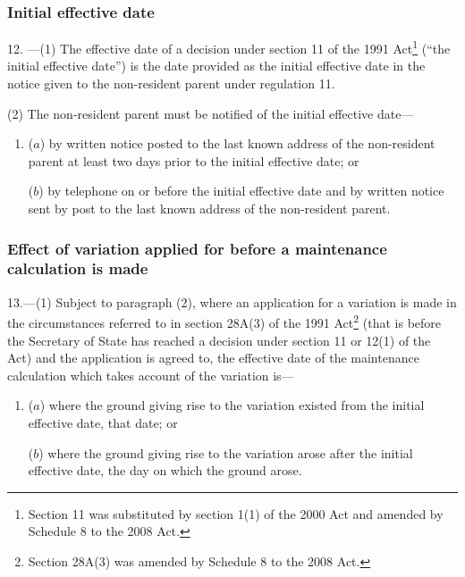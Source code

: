 \documentclass[12pt,a4paper]{article}
\begin{document}
\renewcommand\parthead{--- Part III Chapter I}

\subsubsection[12. Initial effective date]{Initial effective date}

12.%
---(1)  %
  The effective date of a decision under section 11 of the 1991 Act\footnote{Section 11 was substituted by section 1(1) of the 2000 Act and amended by Schedule 8 to the 2008 Act.} (“the initial effective date”) is the date 
provided as the initial effective date in the notice  %
given to the non-resident parent 
under  %
regulation 11.

(2) The non-resident parent must be notified of the initial effective date—
\begin{enumerate}\item[]
($a$) by written notice posted to the last known address of the non-resident parent at least two days prior to the initial effective date; or

($b$) by telephone on or before the initial effective date and by written notice sent by post to the last known address of the non-resident parent.
\end{enumerate}


\subsubsection[13. Effect of variation applied for before a maintenance calculation is made]{Effect of variation applied for before a maintenance calculation is made}

13.---(1)  Subject to paragraph (2), where an application for a variation is made in the circumstances referred to in section 28A(3) of the 1991 Act\footnote{Section 28A(3) was amended by Schedule 8 to the 2008 Act.} (that is before the Secretary of State has reached a decision under section 11 or 12(1) of the Act) and the application is agreed to, the effective date of the maintenance calculation which takes account of the variation is—
\begin{enumerate}\item[]
($a$) where the ground giving rise to the variation existed from the initial effective date, that date; or

($b$) where the ground giving rise to the variation arose after the initial effective date, the day on which the ground arose.
\end{enumerate}
\end{document}
